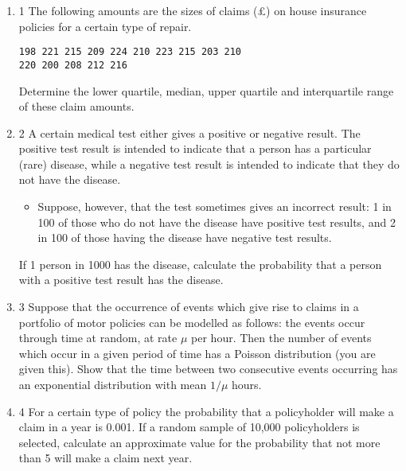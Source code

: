 \documentclass[a4paper,12pt]{article}
\begin{document}
\begin{enumerate}
\item 1 The following amounts are the sizes of claims (£) on house insurance policies for a
certain type of repair.
\begin{verbatim}
198 221 215 209 224 210 223 215 203 210
220 200 208 212 216
\end{verbatim}

Determine the lower quartile, median, upper quartile and interquartile range of
these claim amounts. 
\item 2 A certain medical test either gives a positive or negative result. The positive test
result is intended to indicate that a person has a particular (rare) disease, while
a negative test result is intended to indicate that they do not have the disease.
\begin{itemize}
    \item Suppose, however, that the test sometimes gives an incorrect result: 1 in 100 of
those who do not have the disease have positive test results, and 2 in 100 of those
having the disease have negative test results.
\end{itemize}

If 1 person in 1000 has the disease, calculate the probability that a person with a
positive test result has the disease. 
\item 3 Suppose that the occurrence of events which give rise to claims in a portfolio of
motor policies can be modelled as follows: the events occur through time at
random, at rate $\mu$ per hour. Then the number of events which occur in a given
period of time has a Poisson distribution (you are given this).
Show that the time between two consecutive events occurring has an exponential
distribution with mean $1/\mu$ hours. 
\item 4 For a certain type of policy the probability that a policyholder will make a claim
in a year is 0.001. If a random sample of 10,000 policyholders is selected,
calculate an approximate value for the probability that not more than 5 will
make a claim next year. 
\end{enumerate}
\newpage
\end{document}

